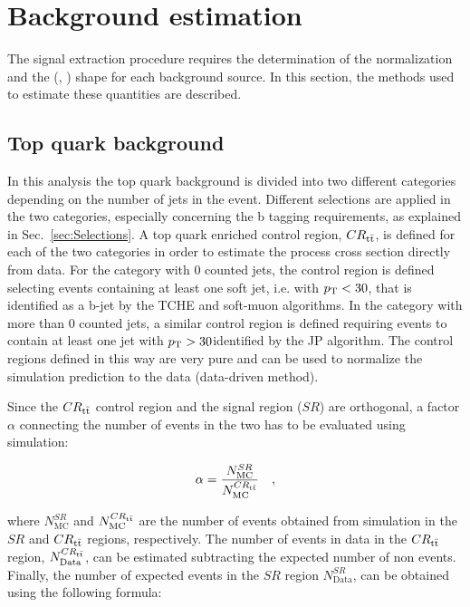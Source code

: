 \section{Background estimation}
\label{sec:Backgrounds}
The signal extraction procedure requires the determination of the normalization and the (\mll, \mt)
shape for each background source. In this section, the methods used to estimate these quantities are described.

\subsection{Top quark background \label{sec:TTBackground}}

In this analysis the top quark background is divided into two different categories depending on the number of jets in the event. Different selections are applied in the two categories, especially concerning the b tagging requirements, as explained in Sec.~\ref{sec:Selections}.
A top quark enriched control region, $CR_{\mathrm{t}\bar{\mathrm{t}}}$, is defined for each of the two categories in order to estimate the process cross section directly from data. For the category with 0 counted jets, the control region is defined selecting events containing at least one soft jet, i.e. with $p_\mathrm{T} < 30$\GeV, that is identified as a b-jet by the TCHE and soft-muon algorithms. In the category with more than 0 counted jets, a similar control region is defined requiring events to contain at least one jet with $p_\mathrm{T}>30$\GeV identified by the JP algorithm. The control regions defined in this way are very pure and can be used to normalize the simulation prediction to the data (data-driven method).

Since the $CR_{\mathrm{t}\bar{\mathrm{t}}}$ control region and the signal region ($SR$) are orthogonal, a factor $\alpha$ connecting the number of events in the two has to be evaluated using simulation:

\begin{equation}
\alpha = \frac{N_\mathrm{MC}^{SR}}{N_\mathrm{MC}^{CR_{\mathrm{t}\bar{\mathrm{t}}}}} \quad ,
\end{equation}

where $N_\mathrm{MC}^{SR}$ and $N_\mathrm{MC}^{CR_{\mathrm{t}\bar{\mathrm{t}}}}$ are the number of \ttbar events obtained from simulation in the $SR$ and $CR_{\mathrm{t}\bar{\mathrm{t}}}$ regions, respectively. The number of \ttbar events in data in the $CR_{\mathrm{t}\bar{\mathrm{t}}}$ region, $N_\mathrm{Data}^{CR_{\mathrm{t}\bar{\mathrm{t}}}}$, can be estimated subtracting the expected number of non \ttbar events. Finally, the number of expected events in the $SR$ region $N_\mathrm{Data}^{SR}$, can be obtained using the following formula:

